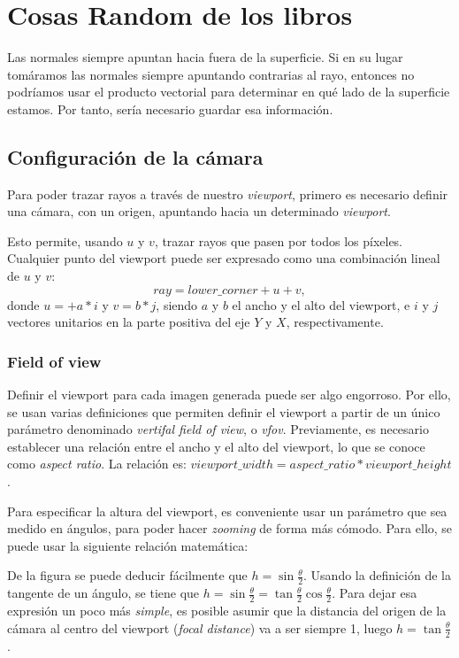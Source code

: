 \chapter {Cosas Random de los libros}

Las normales siempre apuntan hacia fuera de la superficie. Si en su lugar tomáramos las normales siempre apuntando contrarias al rayo, entonces no podríamos usar el producto vectorial para determinar en qué lado de la superficie estamos. Por tanto, sería necesario guardar esa información.


\section{Configuración de la cámara}

Para poder trazar rayos a través de nuestro \textit{viewport}, primero es necesario definir una cámara, con un origen, apuntando hacia un determinado \textit{viewport}.


Esto permite, usando $u$ y $v$, trazar rayos que pasen por todos los píxeles. Cualquier punto del viewport puede ser expresado como una combinación lineal de $u$ y $v$: 
\[
ray=lower\_corner+u+v,
\]
donde $u=+a*i$ y $v=b*j$, siendo $a$ y $b$ el ancho y el alto del viewport, e $i$ y $j$ vectores unitarios en la parte positiva del eje $Y$ y $X$, respectivamente. 

\subsection{Field of view}

Definir el viewport para cada imagen generada puede ser algo engorroso. Por ello, se usan varias definiciones que permiten definir el viewport a partir de un único parámetro denominado \textit{vertifal field of view}, o \textit{vfov}. Previamente, es necesario establecer una relación entre el ancho y el alto del viewport, lo que se conoce como \textit{aspect ratio}. La relación es: $viewport\_width=aspect\_ratio*viewport\_height$.

Para especificar la altura del viewport, es conveniente usar un parámetro que sea medido en ángulos, para poder hacer \textit{zooming} de forma más cómodo. Para ello, se puede usar la siguiente relación matemática:


De la figura se puede deducir fácilmente que $h=\sin\frac{\theta}{2}$. Usando la definición de la tangente de un ángulo, se tiene que $h=\sin\frac{\theta}{2}=\tan\frac{\theta}{2}\cos\frac{\theta}{2}$. Para dejar esa expresión un poco más \textit{simple}, es posible asumir que la distancia del origen de la cámara al centro del viewport (\textit{focal distance}) va a ser siempre 1, luego $h=\tan\frac{\theta}{2}$.

